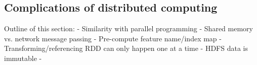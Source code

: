 \subsection{Complications of distributed computing}

Outline of this section:
- Similarity with parallel programming
    - Shared memory vs. network message passing
- Pre-compute feature name/index map
- Transforming/referencing RDD can only happen one at a time
- HDFS data is immutable
- 